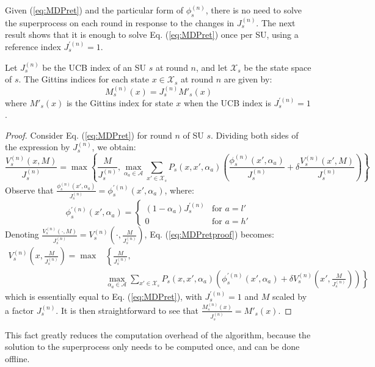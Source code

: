 Given (\ref{eq:MDPret}) and the particular form of $\phi_s^{(n)}$, there is no need to solve the superprocess on each round in response to the changes in $J_s^{(n)}$. The next result shows that it is enough to solve Eq. (\ref{eq:MDPret}) once per SU, using a reference index $J_s^{\prime(n)} = 1$.
\begin{prop}
Let $J_s^{(n)}$ be the UCB index of an SU $s$ at round $n$, and let $\mathcal{X}_s$ be the state space of $s$. The Gittins indices for each state $x \in \mathcal{X}_s$ at round $n$ are given by:
\begin{equation}
M_s^{(n)}(x) = J_s^{(n)}M'_s(x)
\end{equation}  
where $M'_s(x)$ is the Gittins index for state $x$ when the UCB index is $J_s^{\prime(n)} = 1$.
\end{prop}
\begin{proof}
Consider Eq. (\ref{eq:MDPret}) for round $n$ of SU $s$. Dividing both sides of the expression by $J_s^{(n)}$, we obtain:
\begin{equation}\label{eq:MDPretproof}
\frac{V_s^{(n)}(x,M)}{J_s^{(n)}} = \max\left\{\frac{M}{J_s^{(n)}},\max_{\alpha_a \in \mathcal{A}} \sum_{x' \in \mathcal{X}_s} P_s(x,x',\alpha_a)\left(\frac{\phi_s^{(n)}(x',\alpha_a)}{J_s^{(n)}}+\delta \frac{V_s^{(n)}(x',M)}{J_s^{(n)}}\right)\right\}
\end{equation}
Observe that $\frac{\phi_s^{(n)}(x',\alpha_a)}{J_s^{(n)}} = \phi_s^{\prime(n)}(x',\alpha_a)$, where:
\begin{equation}
\phi_s^{\prime(n)}(x',\alpha_a) = 
\begin{cases}
    (1 - \alpha_a) J_s^{\prime(n)} & \text{for } a = l'\\
    0 & \text{for } a = h'
   \end{cases}
\end{equation}
Denoting $\frac{V_s^{(n)}(\cdot,M)}{J_s^{(n)}} = V_s^{(n)}(\cdot,\frac{M}{J_s^{(n)}})$, Eq. (\ref{eq:MDPretproof}) becomes:
\begin{equation}
\begin{array}{ll}
V_s^{(n)}\left(x,\frac{M}{J_s^{(n)}}\right) = \max & \left\{\frac{M}{J_s^{(n)}},\right.\\
&\left.\underset{\alpha_a \in \mathcal{A}}\max \sum_{x' \in \mathcal{X}_s} P_s(x,x',\alpha_a)\left(\phi_s^{\prime(n)}(x',\alpha_a)+\delta V_s^{(n)}\left(x',\frac{M}{J_s^{(n)}}\right)\right)\right\}
\end{array}
\end{equation} 
which is essentially equal to Eq. (\ref{eq:MDPret}), with $J_s^{\prime(n)} = 1$ and $M$ scaled by a factor $J_s^{(n)}$. It is then straightforward to see that $\frac{M_s^{(n)}(x)}{J_s^{(n)}} = M'_s(x)$.
\end{proof}
This fact greatly reduces the computation overhead of the algorithm, because the solution to the superprocess only needs to be computed once, and can be done offline.


